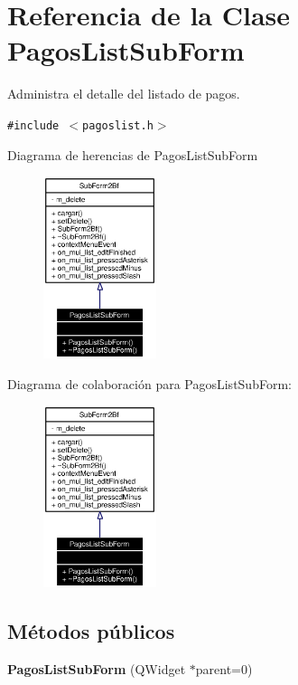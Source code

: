 \section{Referencia de la Clase Pagos\-List\-Sub\-Form}
\label{classPagosListSubForm}
Administra el detalle del listado de pagos.  


{\tt \#include $<$pagoslist.h$>$}

Diagrama de herencias de Pagos\-List\-Sub\-Form\begin{figure}[H]
\begin{center}
\leavevmode
\includegraphics[width=94pt]{classPagosListSubForm__inherit__graph}
\end{center}
\end{figure}
Diagrama de colaboraci\'{o}n para Pagos\-List\-Sub\-Form:\begin{figure}[H]
\begin{center}
\leavevmode
\includegraphics[width=94pt]{classPagosListSubForm__coll__graph}
\end{center}
\end{figure}
\subsection*{M\'{e}todos p\'{u}blicos}
\begin{CompactItemize}
\item 
{\bf Pagos\-List\-Sub\-Form} (QWidget $\ast$parent=0)
\end{CompactItemize}


